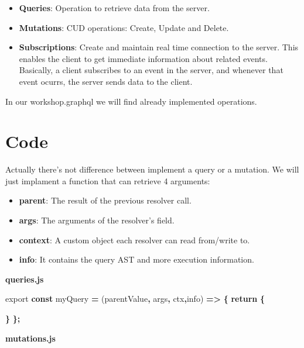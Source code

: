 \documentclass[]{book}
\newenvironment{Shaded}{\begin{snugshade}}{\end{snugshade}}
\newcommand{\KeywordTok}[1]{\textcolor[rgb]{0.13,0.29,0.53}{\textbf{#1}}}
\newcommand{\ImportTok}[1]{#1}
\newcommand{\ControlFlowTok}[1]{\textcolor[rgb]{0.13,0.29,0.53}{\textbf{#1}}}
\newcommand{\OperatorTok}[1]{\textcolor[rgb]{0.81,0.36,0.00}{\textbf{#1}}}
\newcommand{\NormalTok}[1]{#1}
\providecommand{\tightlist}{%
  \setlength{\itemsep}{0pt}\setlength{\parskip}{0pt}}
\begin{document}
\begin{itemize}
\tightlist
\item
  \textbf{Queries}: Operation to retrieve data from the server.
\item
  \textbf{Mutations}: CUD operations: Create, Update and Delete.
\item
  \textbf{Subscriptions}: Create and maintain real time connection to
  the server. This enables the client to get immediate information about
  related events. Basically, a client subscribes to an event in the
  server, and whenever that event ocurrs, the server sends data to the
  client.
\end{itemize}

In our workshop.graphql we will find already implemented operations.

\section{Code}\label{code-1}

Actually there's not difference between implement a query or a mutation.
We will just implament a function that can retrieve 4 arguments:

\begin{itemize}
\tightlist
\item
  \textbf{parent}: The result of the previous resolver call.
\item
  \textbf{args}: The arguments of the resolver's field.
\item
  \textbf{context}: A custom object each resolver can read from/write
  to.
\item
  \textbf{info}: It contains the query AST and more execution
  information.
\end{itemize}

\textbf{queries.js}

\begin{Shaded}
\begin{Highlighting}[]

\ImportTok{export} \KeywordTok{const}\NormalTok{ myQuery }\OperatorTok{=}\NormalTok{ (parentValue}\OperatorTok{,}\NormalTok{ args}\OperatorTok{,}\NormalTok{ ctx}\OperatorTok{,}\NormalTok{info) }\OperatorTok{=>} \OperatorTok{\{}
    \ControlFlowTok{return} \OperatorTok{\{}
        
    \OperatorTok{\}}
\OperatorTok{\};}
\end{Highlighting}
\end{Shaded}

\textbf{mutations.js}
\end{document}
